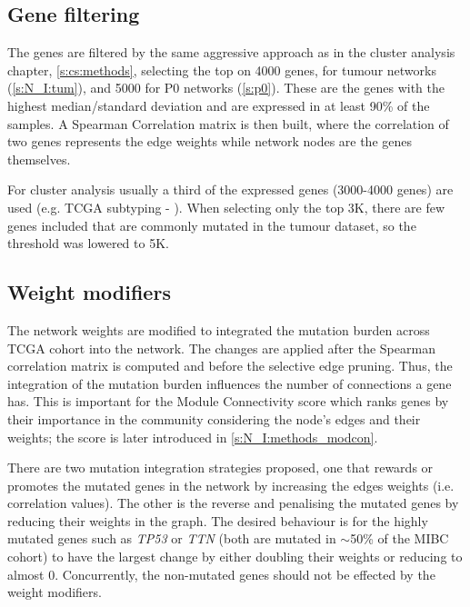 \subsection{Gene filtering} \label{s:N_I:gene_filtering}

The genes are filtered by the same aggressive approach as in the cluster analysis chapter, \cref{s:cs:methods}, selecting the top on 4000 genes, for tumour networks (\cref{s:N_I:tum}), and 5000 for P0 networks (\cref{s:p0}). These are the genes with the highest median/standard deviation and are expressed in at least 90\% of the samples. A Spearman Correlation matrix is then built, where the correlation of two genes represents the edge weights while network nodes are the genes themselves. 

For cluster analysis usually a third of the expressed genes (3000-4000 genes) are used (e.g. TCGA subtyping - \citet{Robertson2017-mg}). When selecting only the top 3K, there are few genes included that are commonly mutated in the tumour dataset, so the threshold was lowered to 5K.

\subsection{Weight modifiers} \label{s:N_I:weight_modifiers}

The network weights are modified to integrated the mutation burden across TCGA cohort into the network. The changes are applied after the Spearman correlation matrix is computed and before the selective edge pruning. Thus, the integration of the mutation burden influences the number of connections a gene has. This is important for the Module Connectivity score which ranks genes by their importance in the community considering the node's edges and their weights; the score is later introduced in \cref{s:N_I:methods_modcon}.

There are two mutation integration strategies proposed, one that rewards or promotes the mutated genes in the network by increasing the edges weights (i.e. correlation values). The other is the reverse and penalising the mutated genes by reducing their weights in the graph. The desired behaviour is for the highly mutated genes such as \textit{TP53} or \textit{TTN} (both are mutated in $\sim$50\% of the MIBC cohort) to have the largest change by either doubling their weights or reducing to almost 0. Concurrently, the non-mutated genes should not be effected by the weight modifiers.

